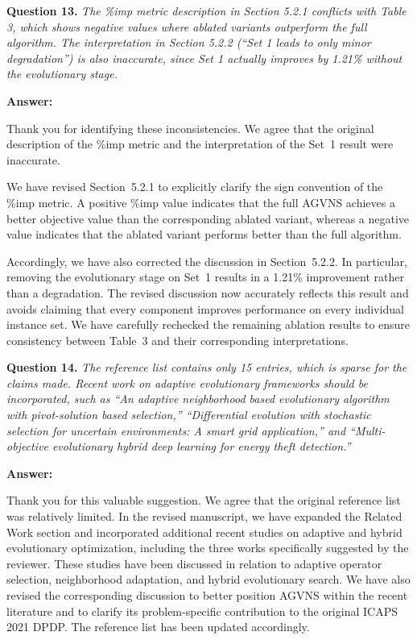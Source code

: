 \documentclass[11pt]{article}
\newcommand{\question}[2]{\vspace{0.5em}\noindent\textbf{Question #1.} \emph{#2}\par}
\newcommand{\answer}{\noindent\textbf{Answer:}\par}
\begin{document}
\question{13}{The \%imp metric description in Section 5.2.1 conflicts with Table 3, which shows negative values where ablated variants outperform the full algorithm. The interpretation in Section 5.2.2 (``Set 1 leads to only minor degradation'') is also inaccurate, since Set 1 actually improves by 1.21\% without the evolutionary stage.}
\answer
Thank you for identifying these inconsistencies. We agree that the original description of the \%imp metric and the interpretation of the Set~1 result were inaccurate.

We have revised Section~5.2.1 to explicitly clarify the sign convention of the \%imp metric. A positive \%imp value indicates that the full AGVNS achieves a better objective value than the corresponding ablated variant, whereas a negative value indicates that the ablated variant performs better than the full algorithm.

Accordingly, we have also corrected the discussion in Section~5.2.2. In particular, removing the evolutionary stage on Set~1 results in a 1.21\% improvement rather than a degradation. The revised discussion now accurately reflects this result and avoids claiming that every component improves performance on every individual instance set. We have carefully rechecked the remaining ablation results to ensure consistency between Table~3 and their corresponding interpretations.


\question{14}{The reference list contains only 15 entries, which is sparse for the claims made. Recent work on adaptive evolutionary frameworks should be incorporated, such as ``An adaptive neighborhood based evolutionary algorithm with pivot-solution based selection,'' ``Differential evolution with stochastic selection for uncertain environments: A smart grid application,'' and ``Multi-objective evolutionary hybrid deep learning for energy theft detection.''}
\answer
Thank you for this valuable suggestion. We agree that the original reference list was relatively limited. In the revised manuscript, we have expanded the Related Work section and incorporated additional recent studies on adaptive and hybrid evolutionary optimization, including the three works specifically suggested by the reviewer. These studies have been discussed in relation to adaptive operator selection, neighborhood adaptation, and hybrid evolutionary search. We have also revised the corresponding discussion to better position AGVNS within the recent literature and to clarify its problem-specific contribution to the original ICAPS 2021 DPDP. The reference list has been updated accordingly.
\end{document}
